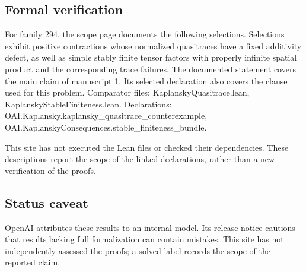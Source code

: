 \documentclass[11pt]{article}
\begin{document}
\subsection{Formal verification}
For family 294, the scope page documents the following selections. Selections exhibit positive contractions whose normalized quasitraces have a fixed additivity defect, as well as simple stably finite tensor factors with properly infinite spatial product and the corresponding trace failures. The documented statement covers the main claim of manuscript 1. Its selected declaration also covers the clause used for this problem. Comparator files: KaplanskyQuasitrace.lean, KaplanskyStableFiniteness.lean. Declarations: OAI.Kaplansky.kaplansky\_quasitrace\_counterexample, OAI.KaplanskyConsequences.stable\_finiteness\_bundle.

This site has not executed the Lean files or checked their dependencies. These descriptions report the scope of the linked declarations, rather than a new verification of the proofs.

\subsection{Status caveat}
OpenAI attributes these results to an internal model. Its release notice cautions that results lacking full formalization can contain mistakes. This site has not independently assessed the proofs; a solved label records the scope of the reported claim.
\end{document}
